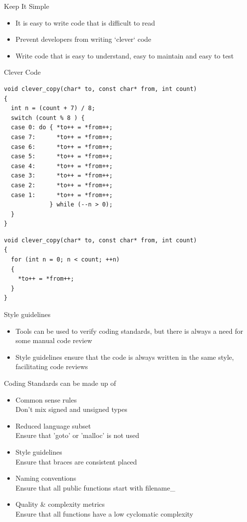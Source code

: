 \documentclass{beamer}
\begin{document}
\begin{frame}{Keep It Simple}
\begin{itemize}
  \item It is easy to write code that is difficult to read
  \item Prevent developers from writing `clever` code
  \item Write code that is easy to understand, easy to maintain and easy to test
\end{itemize}
\end{frame}

\begin{frame}[fragile]{Clever Code}
\begin{lstlisting}
void clever_copy(char* to, const char* from, int count)
{
  int n = (count + 7) / 8;
  switch (count % 8 ) {
  case 0: do { *to++ = *from++;
  case 7:      *to++ = *from++;
  case 6:      *to++ = *from++;
  case 5:      *to++ = *from++;
  case 4:      *to++ = *from++;
  case 3:      *to++ = *from++;
  case 2:      *to++ = *from++;
  case 1:      *to++ = *from++;
             } while (--n > 0);
  }
}
\end{lstlisting}

\begin{lstlisting}
void clever_copy(char* to, const char* from, int count)
{
  for (int n = 0; n < count; ++n)
  {
    *to++ = *from++; 
  }
}
\end{lstlisting}
\end{frame}

\begin{frame}{Style guidelines}
\begin{itemize}
  \item Tools can be used to verify coding standards, but there is always a need
  for some manual code review
  \item Style guidelines ensure that the code is always written in the same
  style, facilitating code reviews 
\end{itemize}
\end{frame}


\begin{frame}{Coding Standards can be made up of}
\begin{itemize}
  \item \normalsize Common sense rules \\ \tiny Don’t mix signed and unsigned
  types
  \item \normalsize Reduced language subset \\ \tiny Ensure that 'goto' or
  'malloc' is not used
  \item \normalsize Style guidelines \\ \tiny Ensure that braces are consistent
  placed
  \item \normalsize Naming conventions \\ \tiny Ensure that all public functions
  start with filename\_
  \item \normalsize Quality \& complexity metrics \\ \tiny Ensure that all
  functions have a low cyclomatic complexity
\end{itemize}
\end{frame}
\end{document}
